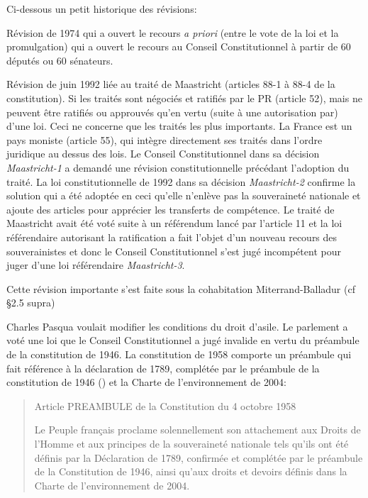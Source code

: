 \documentclass[math]{cours}
\begin{document}
Ci-dessous un petit historique des révisions:
\begin{description}
	\item Révision de 1974 qui a ouvert le recours \emph{a priori} (entre le vote de la loi et la promulgation) qui a ouvert le recours au Conseil Constitutionnel à partir de 60 députés ou 60 sénateurs.
	\item Révision de juin 1992 liée au traité de Maastricht (articles 88-1 à 88-4 de la constitution).
		Si les traités sont négociés et ratifiés par le PR (article 52), mais ne peuvent être ratifiés ou approuvés qu'en vertu (suite à une autorisation par) d'une loi. Ceci ne concerne que les traités les plus importants.
		La France est un pays moniste (article 55), qui intègre directement ses traités dans l'ordre juridique au dessus des lois.
		Le Conseil Constitutionnel dans sa décision \emph{Maastricht-1} a demandé une révision constitutionnelle précédant l'adoption du traité.
		La loi constitutionnelle de 1992 dans sa décision \emph{Maastricht-2} confirme la solution qui a été adoptée en ceci qu'elle n'enlève pas la souveraineté nationale et ajoute des articles pour apprécier les transferts de compétence.
		Le traité de Maastricht avait été voté suite à un référendum lancé par l'article 11 et la loi référendaire autorisant la ratification a fait l'objet d'un nouveau recours des souverainistes et donc le Conseil Constitutionnel s'est jugé incompétent pour juger d'une loi référendaire \emph{Maastricht-3}.
	\item[Révision de juillet 1993 sur le CSM et la Cour de justice de la République] Cette révision importante s'est faite sous la cohabitation Miterrand-Balladur (cf §2.5 supra)
	\item[Révision de novembre 1993 sur le droit d'asile (\emph{validation constitutionelle})]
		Charles Pasqua voulait modifier les conditions du droit d'asile.
		Le parlement a voté une loi que le Conseil Constitutionnel a jugé invalide en vertu du préambule de la constitution de 1946.
		La constitution de 1958 comporte un préambule qui fait référence à la déclaration de 1789, complétée par le préambule de la constitution de 1946 (\cite{constitution46}) et la Charte de l'environnement de 2004:
		\begin{quote}
			\begin{center}
				Article PREAMBULE de la Constitution du 4 octobre 1958
			\end{center}
			Le Peuple français proclame solennellement son attachement aux Droits de l'Homme et aux principes de la souveraineté nationale tels qu'ils ont été définis par la Déclaration de 1789, confirmée et complétée par le préambule de la Constitution de 1946, ainsi qu'aux droits et devoirs définis dans la Charte de l'environnement de 2004.


\end{quote}
\end{description}
\end{document}
